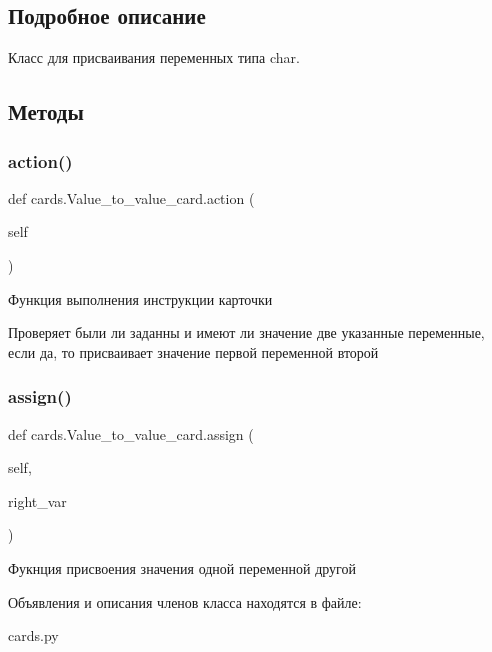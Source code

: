 \subsection{Подробное описание}
Класс для присваивания переменных типа char. 



\subsection{Методы}
\mbox{\label{classcards_1_1_value__to__value__card_a53427d76f480c24a0790c07a0141c0c8}} 
\subsubsection{\texorpdfstring{action()}{action()}}
{\footnotesize\ttfamily def cards.\+Value\+\_\+to\+\_\+value\+\_\+card.\+action (\begin{DoxyParamCaption}\item[{}]{self }\end{DoxyParamCaption})}



Функция выполнения инструкции карточки 

Проверяет были ли заданны и имеют ли значение две указанные переменные, если да, то присваивает значение первой переменной второй \mbox{\label{classcards_1_1_value__to__value__card_a4e0c59c1bfc953e4550ac296ddfa74d3}} 
\subsubsection{\texorpdfstring{assign()}{assign()}}
{\footnotesize\ttfamily def cards.\+Value\+\_\+to\+\_\+value\+\_\+card.\+assign (\begin{DoxyParamCaption}\item[{}]{self,  }\item[{}]{right\+\_\+var }\end{DoxyParamCaption})}



Фукнция присвоения значения одной переменной другой 



Объявления и описания членов класса находятся в файле\+:\begin{DoxyCompactItemize}
\item 
cards.\+py\end{DoxyCompactItemize}

